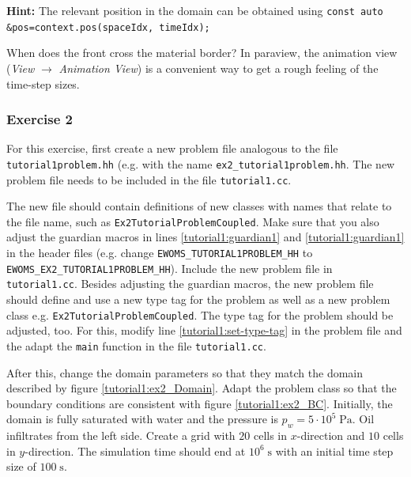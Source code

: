 \begin{enumerate}
\textbf{Hint:} The relevant position in the domain can be obtained using
\texttt{const auto \&pos=context.pos(spaceIdx, timeIdx);}

When does the front cross the material border? In paraview, the
animation view (\textit{View} $\rightarrow$ \textit{Animation View})
is a convenient way to get a rough feeling of the time-step sizes.
\end{enumerate}

\subsubsection{Exercise 2}

For this exercise, first create a new problem file analogous to the
file \texttt{tutorial1problem.hh} (e.g. with the name
\texttt{ex2\_tutorial1problem.hh}. The new problem
file needs to be included in the file \texttt{tutorial1.cc}.

The new file should contain definitions of new classes with names that
relate to the file name, such as
\texttt{Ex2TutorialProblemCoupled}. Make sure that you also adjust the
guardian macros in lines \ref{tutorial1:guardian1} and
\ref{tutorial1:guardian1} in the header files (e.g. change
\mbox{\texttt{EWOMS\_TUTORIAL1PROBLEM\_HH}} to
\mbox{\texttt{EWOMS\_EX2\_TUTORIAL1PROBLEM\_HH}}). Include the
new problem file in \texttt{tutorial1.cc}.  Besides adjusting
the guardian macros, the new problem file should define and use a new
type tag for the problem as well as a new problem class
e.g. \mbox{\texttt{Ex2TutorialProblemCoupled}}. The type tag for the
problem should be adjusted, too. For this, modify line
\ref{tutorial1:set-type-tag} in the problem file and the adapt
the \texttt{main} function in the file \texttt{tutorial1.cc}.

After this, change the domain parameters so that they match the domain
described by figure \ref{tutorial1:ex2_Domain}. Adapt the
problem class so that the boundary conditions are consistent with
figure \ref{tutorial1:ex2_BC}. Initially, the domain is fully
saturated with water and the pressure is $p_w = 5\cdot
10^5\;\text{Pa}$. Oil infiltrates from the left side. Create a grid
with $20$ cells in $x$-direction and $10$ cells in $y$-direction. The
simulation time should end at $10^6\;\text{s}$ with an initial time
step size of $100\;\text{s}$.

